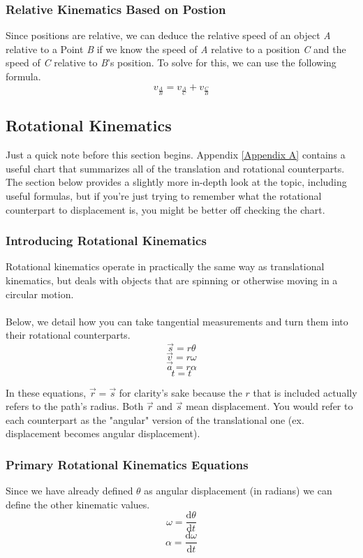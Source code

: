 \documentclass{article}
\begin{document}
\subsubsection{Relative Kinematics Based on Postion}
Since positions are relative, we can deduce the relative speed of an object \textit{A} relative to a Point \textit{B} if we know the speed of \textit{A} relative to a position \textit{C} and the speed of \textit{C} relative to \textit{B}'s position. To solve for this, we can use the following formula.
\begin{equation}
    v_{\frac{A}{B}} = v_{\frac{A}{C}} +  v_{\frac{C}{B}}
\end{equation}
\subsection{Rotational Kinematics}

Just a quick note before this section begins. Appendix \ref{Appendix A} contains a useful chart that summarizes all of the translation and rotational counterparts. The section below provides a slightly more in-depth look at the topic, including useful formulas, but if you're just trying to remember what the rotational counterpart to displacement is, you might be better off checking the chart.
\newpage
\subsubsection{Introducing Rotational Kinematics} \label{trans to ang}
Rotational kinematics operate in practically the same way as translational kinematics, but deals with objects that are spinning or otherwise moving in a circular motion. \\ \\
Below, we detail how you can take tangential measurements and turn them into their rotational counterparts. \\
\[ \vec{s} = r \theta \]
\[ \vec{v} = r \omega \]
\[ \vec{a} = r \alpha \]
\[ t = t \]

\noindent In these equations, $\vec{r} = \vec{s}$ for clarity's sake because the $r$ that is included actually refers to the path's radius. Both $\vec{r}$ and $\vec{s}$ mean displacement. You would refer to each counterpart as the "angular" version of the translational one (ex. displacement becomes angular displacement).

\subsubsection{Primary Rotational Kinematics Equations}
Since we have already defined $\theta$ as angular displacement (in radians) we can define the other kinematic values.
\begin{equation}
    \omega = \frac{\mathrm{d}\theta}{\mathrm{d}t}
\end{equation}
\begin{equation}
    \alpha = \frac{\mathrm{d}\omega}{\mathrm{d}t}
\end{equation}
\end{document}

